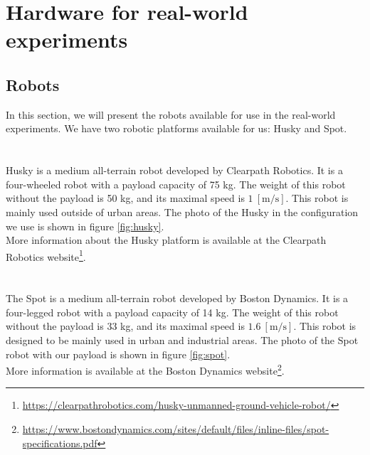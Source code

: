 \section{Hardware for real-world experiments}
    \subsection{Robots}
        In this section, we will present the robots available for use in the real-world experiments. We have two robotic platforms available for us: Husky and Spot.\\\\
        \\
        Husky is a medium all-terrain robot developed by Clearpath Robotics. It is a four-wheeled robot with a payload capacity of 75 kg. The weight of this robot without the payload is 50 kg, and its maximal speed is $1\:\mathrm{[m/s]}$. This robot is mainly used outside of urban areas. The photo of the Husky in the configuration we use is shown in figure \ref{fig:husky}.\\
        More information about the Husky platform is available at the Clearpath Robotics website\footnote{\url{https://clearpathrobotics.com/husky-unmanned-ground-vehicle-robot/}}.\\\\
        \\
        The Spot is a medium all-terrain robot developed by Boston Dynamics. It is a four-legged robot with a payload capacity of 14 kg. The weight of this robot without the payload is 33 kg, and its maximal speed is $1.6\:\mathrm{[m/s]}$. This robot is designed to be mainly used in urban and industrial areas. The photo of the Spot robot with our payload is shown in figure \ref{fig:spot}.\\
        More information is available at the Boston Dynamics website\footnote{\url{https://www.bostondynamics.com/sites/default/files/inline-files/spot-specifications.pdf}}.

